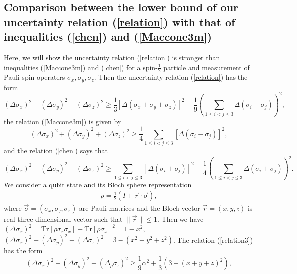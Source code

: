 \documentclass[fleqn,10pt]{wlscirep}
\begin{document}
\subsection*{Comparison between the lower bound of our uncertainty relation (\ref{relation}) with that of inequalities (\ref{chen}) and (\ref{Maccone3m})}

Here, we will show the uncertainty relation (\ref{relation}) is stronger than inequalities (\ref{Maccone3m}) and (\ref{chen}) for a spin-$\frac{1}{2}$ particle and measurement of Pauli-spin operators $\sigma_x,\sigma_y,\sigma_z$.
 Then the uncertainty relation (\ref{relation}) has the form
%
\begin{equation}\label{relation3}
(\Delta \sigma_{x})^{2}+(\Delta \sigma_{y})^{2}+(\Delta \sigma_{z})^{2}
\geq\frac{1}{3}\left[\Delta(\sigma_{x}+\sigma_{y}+\sigma_{z})\right]^{2}
+\frac{1}{9}\left(\sum_{1\leq i<j\leq 3}\Delta(\sigma_{i}-\sigma_{j})\right)^{2},
\end{equation}
%
the relation (\ref{Maccone3m}) is given by
%
\begin{equation}\label{Maccone3}
(\Delta \sigma_{x})^{2}+(\Delta \sigma_{y})^{2}+(\Delta \sigma_{z})^{2}
\geq\frac{1}{4}\sum_{1\leq i<j\leq 3}[\Delta(\sigma_{i}-\sigma_{j})]^{2},
\end{equation}
%
and the relation (\ref{chen}) says that
%
\begin{equation}\label{chen3}
(\Delta \sigma_{x})^{2}+(\Delta \sigma_{y})^{2}+(\Delta \sigma_{z})^{2}
\geq\sum_{1\leq i<j\leq 3}\left[\Delta (\sigma_{i}+\sigma_{j})\right]^2-\frac{1}{4}\left(\sum_{1\leq i<j\leq 3}\Delta (\sigma_{i}+\sigma_{j})\right)^2.
\end{equation}
%
We consider a qubit state
and its Bloch sphere representation
\begin{align}
\rho=\frac{1}{2}(I+\vec{r}\cdot\vec{\sigma}),
\end{align}
where $\vec{\sigma}=(\sigma_x,\sigma_y,\sigma_z)$ are Pauli matrices
and the Bloch vector $\vec{r}=(x,y,z)$ is real three-dimensional vector
such that $\|\vec{r}\|\leq 1$.
Then we have $(\Delta \sigma_{x})^{2}=\text{Tr}[\rho \sigma_{x} \sigma_{x} ]-\text{Tr}[\rho \sigma_{x}]^2=1-x^2$,
$(\Delta \sigma_{x})^{2}+(\Delta \sigma_{y})^{2}+(\Delta \sigma_{z})^{2}=3-(x^2+y^2+z^2)$.
The relation (\ref{relation3}) has the form
%
\begin{equation}\label{relation33}
(\Delta \sigma_{x})^{2}+(\Delta \sigma_{y})^{2}+(\Delta_\rho \sigma_{z})^{2}
\geq\frac{1}{9}\alpha^2+\frac{1}{3} \left(3-(x+y+z)^2\right),
\end{equation}
\end{document}
